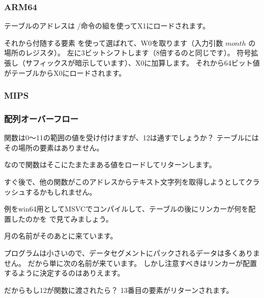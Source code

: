 \subsubsection{ARM64}




テーブルのアドレスは \ADRP/\ADD 命令の組を使ってX1にロードされます。

それから付随する要素 \LDR を使って選ばれて、W0を取ります（入力引数 $month$ の場所のレジスタ）。
左に3ビットシフトします（8倍するのと同じです）。
符号拡張し（サフィックスが暗示しています）、X0に加算します。
それから64ビット値がテーブルからX0にロードされます。

\subsubsection{MIPS}



\subsubsection{配列オーバーフロー}

関数は0～11の範囲の値を受け付けますが、12は通すでしょうか？
テーブルにはその場所の要素はありません。

なので関数はそこにたまたまある値をロードしてリターンします。

すぐ後で、他の関数がこのアドレスからテキスト文字列を取得しようとしてクラッシュするかもしれません。

例をwin64用としてMSVCでコンパイルして、テーブルの後にリンカーが何を配置したのかを \IDA で見てみましょう。



月の名前がそのあとに来ています。

プログラムは小さいので、データセグメントにパックされるデータは多くありません。
だから単に次の名前が来ています。
しかし注意すべきはリンカーが配置するように決定するのはありえます。

だからもし12が関数に渡されたら？
13番目の要素がリターンされます。

